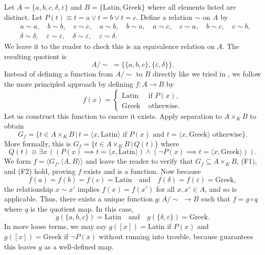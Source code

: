 \begin{example}
	Let $A = \{a, b, c, \delta, \varepsilon\}$ and $B = \{\textrm{Latin}, \textrm{Greek}\}$ where all elements listed are distinct. 
	Let $P(t)\equiv t = a\lor t = b\lor t = c$. 
	Define a relation $\sim$ on $A$ by
	\begin{align*}
		& a\sim a, \quad b\sim b, \quad c\sim c, \quad a\sim b, \quad b\sim a, \quad a\sim c, \quad c\sim a, \quad b\sim c, \quad c\sim b, \\
		& \delta\sim\delta, \quad \varepsilon\sim\varepsilon, \quad \delta\sim \varepsilon, \quad \varepsilon\sim \delta.
	\end{align*}
	We leave it to the reader to check this is an equivalence relation on $A$.
	The resulting quotient is 
	\[ A/\sim\; = \{\{a, b, c\}, \{\varepsilon, \delta\}\}. \]
	Instead of defining a function from $A/\sim$ to $B$ directly like we tried in , we follow the more principled approach by defining $f:A\rightarrow B$ by
	\[ f(x) = \begin{cases}
		\textrm{Latin} &\text{ if } P(x), \\
		\textrm{Greek} &\text{ otherwise}.
	\end{cases} \]
	Let us construct this function to ensure it exists. 
	Apply separation to $A\times_{K} B$ to obtain
	\[ G_{f} = \{ t\in A\times_{K} B \,|\, t = \langle x, \textrm{Latin}\rangle \text{ if } P(x) \text{ and } t = \langle x, \textrm{Greek}\rangle \text{ otherwise} \}. \]
	More formally, this is $G_{f} = \{ t\in A\times_{K} B \,|\, Q(t) \}$ where
	\[ Q(t)\equiv \exists x\, ((P(x)\implies t = \langle x, \textrm{Latin}\rangle)\land (\neg P(x)\implies t = \langle x, \textrm{Greek}\rangle)). \]
	We form $f = \langle G_{f}, \langle A, B\rangle\rangle$ and leave the reader to verify that $G_{f}\subseteq A\times_{K} B$, (F1), and (F2) hold, proving $f$ exists and is a function. 
	Now because 
	\[ f(a) = f(b) = f(c) = \textrm{Latin} \quad\text{and}\quad f(\delta) = f(\varepsilon) = \textrm{Greek}, \] 
	the relationship $x\sim x'$ implies $f(x) = f(x')$ for all $x, x'\in A$, and so  is applicable. 
	Thus, there exists a unique function $g:A/\sim\;\rightarrow B$ such that $f = g\circ q$ where $q$ is the quotient map. 
	In this case, 
	\[ g(\{a, b, c\}) = \textrm{Latin} \quad\text{and}\quad g(\{\delta, \varepsilon\}) = \textrm{Greek}. \]
	In more loose terms, we may say $g([x]) = \textrm{Latin}$ if $P(x)$ and $g([x]) = \textrm{Greek}$ if $\neg P(x)$ without running into trouble, because  guarantees this leaves $g$ as a well-defined map. 
\end{example}


